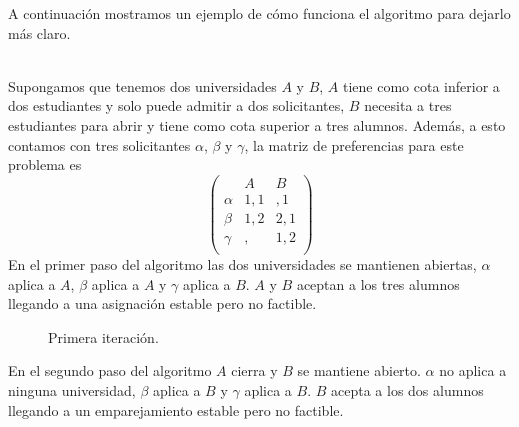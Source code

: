 A continuación mostramos un ejemplo de cómo funciona el algoritmo para dejarlo más claro. 
\begin{eje}
\cite{Todo}\\
Supongamos que tenemos dos universidades $A$ y $B$, $A$ tiene como cota inferior a dos estudiantes y solo puede admitir a dos solicitantes, $B$ necesita a tres estudiantes para abrir y tiene como cota superior a tres alumnos. Además, a esto contamos con tres solicitantes $\alpha$, $\beta$ y $\gamma$, la matriz de preferencias para este problema es 
$$\begin{pmatrix}
& A & B \\
\alpha & 1,1 & ,1 \\
\beta & 1,2 & 2,1 \\ 
\gamma & , & 1,2 \\ 
\end{pmatrix}$$
En el primer paso del algoritmo las dos universidades se mantienen abiertas, $\alpha$ aplica a $A$, $\beta$ aplica a $A$ y $\gamma$ aplica a $B$. $A$ y $B$ aceptan a los tres alumnos llegando a una asignación estable pero no factible. 
\begin{figure}[H]\centering


\caption{Primera iteración.}
\end{figure}

En el segundo paso del algoritmo $A$ cierra y $B$ se mantiene abierto. $\alpha$ no aplica a ninguna universidad, $\beta$ aplica a $B$ y $\gamma$ aplica a $B$. $B$ acepta a los dos alumnos llegando a un emparejamiento estable pero no factible.
\begin{figure}[H]\centering


\end{figure}
\end{eje}
